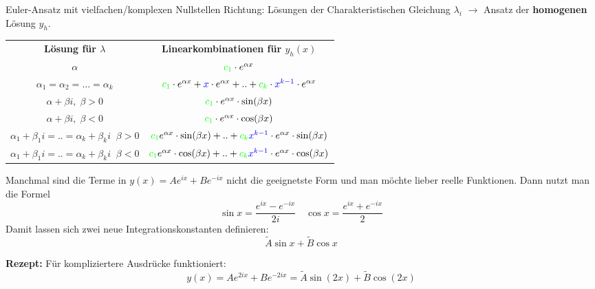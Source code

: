 \begin{Rezept}{Euler-Ansatz mit vielfachen/komplexen Nullstellen}{}
	Richtung: Lösungen der Charakteristischen Gleichung $\lambda_i$ $\to$ Ansatz der \textbf{homogenen} Lösung $y_h$.\\

    \begin{tabular}{c|c}
         \textbf{Lösung für $\lambda$} & \textbf{Linearkombinationen für $y_h(x)$}\\
         $\alpha$ & ${\color{green}c_1} \cdot e^{\alpha x}$\\
         $\alpha_1 = \alpha_2 = \ldots = \alpha_k$ & ${\color{green}c_1} \cdot e^{\alpha x} + {\color{blue} x} \cdot e^{\alpha x} + .. + {\color{green}c_k} \cdot {\color{blue} x^{k-1}} \cdot e^{\alpha x}$\\
         $\alpha + \beta i, \; \beta>0$ & ${\color{green}c_1} \cdot e^{\alpha x} \cdot \sin(\beta x)$\\
         $\alpha + \beta i, \; \beta<0$ & ${\color{green}c_1} \cdot e^{\alpha x} \cdot \cos(\beta x)$\\
         $\alpha_1 + \beta_1 i = .. = \alpha_k + \beta_k i \;\; \beta>0$ & ${\color{green}c_1}e^{\alpha x} \cdot \sin(\beta x) + .. + {\color{green}c_k}{\color{blue} x^{k-1}} \cdot e^{\alpha x} \cdot \sin(\beta x)$\\
         $\alpha_1 + \beta_1 i = .. = \alpha_k + \beta_k i \;\; \beta<0$ & ${\color{green}c_1}e^{\alpha x} \cdot \cos(\beta x) + .. + {\color{green}c_k} {\color{blue} x^{k-1}} \cdot e^{\alpha x} \cdot \cos(\beta x)$\\
    \end{tabular}
\end{Rezept}

\begin{Diverses}{}{}
	Manchmal sind die Terme in $y(x) = Ae^{ix} + Be^{-ix}$ nicht die geeignetste Form und man möchte lieber reelle Funktionen. Dann nutzt man die Formel 
	\[
		\sin x = \frac{e^{ix} - e^{-ix}}{2i} \quad
    	\cos x = \frac{e^{ix} + e^{-ix}}{2}
    \]
	Damit lassen sich zwei neue Integrationskonstanten definieren: \[\widetilde{A} \sin x + \widetilde{B} \cos x\]
	
	\textbf{Rezept:} Für kompliziertere Ausdrücke funktioniert:
	\[
	    y(x) = Ae^{2ix} + Be^{-2ix} = \widetilde{A} \sin (2x) + \widetilde{B} \cos (2x)
	\]
\end{Diverses}

